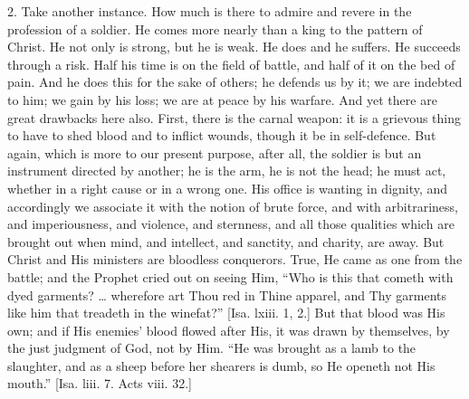 2. Take another instance. How much is there to admire and revere in
the profession of a soldier. He comes more nearly than a king to the
pattern of Christ. He not only is strong, but he is weak. He does and
he suffers. He succeeds through a risk. Half his time is on the field
of battle, and half of it on the bed of pain. And he does this for the
sake of others; he defends us by it; we are indebted to him; we gain
by his loss; we are at peace by his warfare. And yet there are great
drawbacks here also. First, there is the carnal weapon: it is a
grievous thing to have to shed blood and to inflict wounds, though it
be in self-defence. But again, which is more to our present purpose,
after all, the soldier is but an instrument directed by another; he is
the arm, he is not the head; he must act, whether in a right cause or
in a wrong one. His office is wanting in dignity, and accordingly we
associate it with the notion of brute force, and with arbitrariness,
and imperiousness, and violence, and sternness, and all those
qualities which are brought out when mind, and intellect, and
sanctity, and charity, are away. But Christ and His ministers are
bloodless conquerors. True, He came as one from the battle; and the
Prophet cried out on seeing Him, ``Who is this that cometh with
dyed garments? … wherefore art Thou red in Thine apparel, and Thy
garments like him that treadeth in the winefat?'' [Isa. lxiii. 1,
2.] But that blood was His own; and if His enemies' blood flowed after
His, it was drawn by themselves, by the just judgment of God, not by
Him. ``He was brought as a lamb to the slaughter, and as a sheep
before her shearers is dumb, so He openeth not His mouth.'' [Isa.
liii. 7. Acts viii. 32.]

